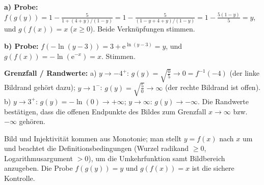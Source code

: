 \begin{kontrolle}
\textbf{a) Probe:}
$f(g(y))=1-\frac5{1+(4+y)/(1-y)}=1-\frac5{(1-y+4+y)/(1-y)}
=1-\frac{5(1-y)}5=y$, und $g(f(x))=x$ ($x\ge0$). Beide Verkn\"upfungen
stimmen.

\textbf{b) Probe:} $f(-\ln(y-3))=3+\mathrm e^{\ln(y-3)}=y$, und
$g(f(x))=-\ln(\mathrm e^{-x})=x$. Stimmen.

\textbf{Grenzfall / Randwerte:} a) $y\to-4^+$: $g(y)
=\sqrt{\frac{0}{5}}\to0=f^{-1}(-4)$ (der linke Bildrand geh\"ort dazu);
$y\to1^-$: $g(y)=\sqrt{\frac{5}{0}}\to\infty$ (der rechte Bildrand ist
offen). b) $y\to3^+$: $g(y)=-\ln(0)\to+\infty$; $y\to\infty$:
$g(y)\to-\infty$. Die Randwerte best\"atigen, dass die offenen Endpunkte
des Bildes zum Grenzfall $x\to\infty$ bzw.\ $-\infty$ geh\"oren.
\end{kontrolle}

\begin{merksatz}
Bild und Injektivit\"at kommen aus Monotonie; man stellt $y=f(x)$ nach
$x$ um und beachtet die Definitionsbedingungen (Wurzel radikand $\ge0$,
Logarithmusargument $>0$), um die Umkehrfunktion samt Bildbereich
anzugeben. Die Probe $f(g(y))=y$ und $g(f(x))=x$ ist die sichere
Kontrolle.
\end{merksatz}
